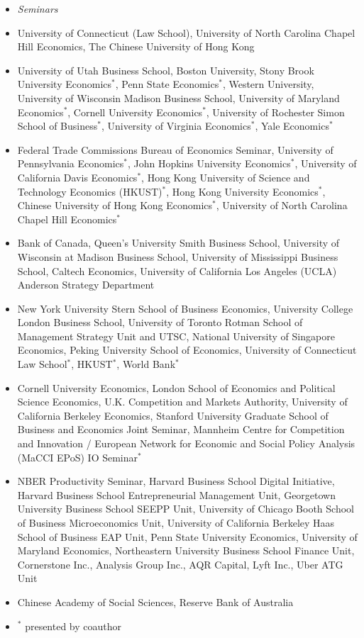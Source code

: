 \begin{itemize}
\item \textit{Seminars}
\item[2025-2026] University of Connecticut (Law School), University of North Carolina Chapel Hill Economics, The Chinese University of Hong Kong
\item[2024-2025] University of Utah Business School, Boston University, Stony Brook University Economics$^{*}$, Penn State Economics$^{*}$, Western University, University of Wisconsin Madison Business School, University of Maryland Economics$^{*}$, Cornell University Economics$^{*}$, University of Rochester Simon School of Business$^{*}$, University of Virginia Economics$^{*}$, Yale Economics$^{*}$
\item[2023-2024] Federal Trade Commissions Bureau of Economics Seminar, University of Pennsylvania Economics$^{*}$, John Hopkins University Economics$^{*}$, University of California Davis Economics$^{*}$, Hong Kong University of Science and Technology Economics (HKUST)$^{*}$, Hong Kong University Economics$^{*}$, Chinese University of Hong Kong Economics$^{*}$, University of North Carolina Chapel Hill Economics$^{*}$
\item[2022-2023] Bank of Canada, Queen's University Smith Business School, University of Wisconsin at Madison Business School, University of Mississippi Business School, Caltech Economics, University of California Los Angeles (UCLA) Anderson Strategy Department
\item[2020-2021] New York University Stern School of Business Economics, University College London Business School, University of Toronto Rotman School of Management Strategy Unit and UTSC, National University of Singapore Economics, Peking University School of Economics, University of Connecticut Law School$^{*}$, HKUST$^{*}$, World Bank$^{*}$
\item[2019-2020] Cornell University Economics, London School of Economics and Political Science Economics, U.K. Competition and Markets Authority, University of California Berkeley Economics, Stanford University Graduate School of Business and Economics Joint Seminar, Mannheim Centre for Competition and Innovation / European Network for Economic and Social Policy Analysis (MaCCI EPoS) IO Seminar$^{*}$
\item[2018-2019]
  NBER Productivity Seminar, Harvard Business School Digital Initiative, Harvard Business School Entrepreneurial Management Unit, Georgetown University Business School SEEPP Unit, University of Chicago Booth School of Business Microeconomics Unit, University of California Berkeley Haas School of Business EAP Unit, Penn State University Economics, University of Maryland Economics, Northeastern University Business School Finance Unit, Cornerstone Inc., Analysis Group Inc., AQR Capital, Lyft Inc., Uber ATG Unit 
\item[2015]	Chinese Academy of Social Sciences, Reserve Bank of Australia
\item $^{*}$ presented by coauthor
\end{itemize}

